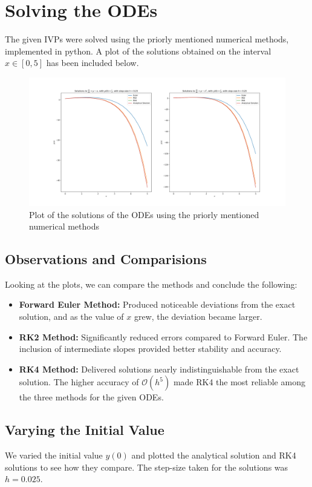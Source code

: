 \documentclass{scrartcl}
\newcommand{\bigO}{\mathcal{O}}
\begin{document}
\section{Solving the ODEs}
The given IVPs were solved using the priorly mentioned numerical methods, implemented in python.
A plot of the solutions obtained on the interval $x \in [0, 5]$ has been included below.
\begin{figure}[h]
    \centering
    \includegraphics[width=\linewidth]{"solutions.png"}
    \caption{Plot of the solutions of the ODEs using the priorly mentioned numerical methods}
\end{figure}
\subsection{Observations and Comparisions}
Looking at the plots, we can compare the methods and conclude the following:
\begin{itemize}
    \item \textbf{Forward Euler Method:} Produced noticeable deviations from the exact solution, and as the value of $x$ grew, the
        deviation became larger.
    \item \textbf{RK2 Method:} Significantly reduced errors compared to Forward Euler. The inclusion of intermediate slopes provided better stability and accuracy.
    \item \textbf{RK4 Method:} Delivered solutions nearly indistinguishable from the exact solution. The higher accuracy of $\bigO(h^5)$ made RK4 the most reliable among the three methods for the given ODEs. 
\end{itemize}
\subsection{Varying the Initial Value}
We varied the initial value $y(0)$ and plotted the analytical solution and RK4 solutions to see how they compare. 
The step-size taken for the solutions was $h = 0.025$.
\end{document}

